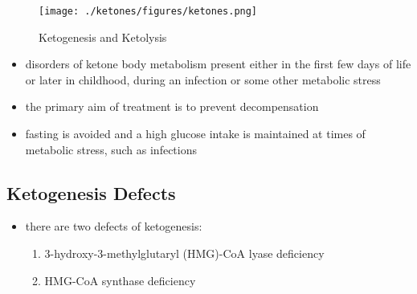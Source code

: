 \documentclass{scrartcl}
\begin{document}
\begin{figure}[htbp]
\centering
\texttt{[image: ./ketones/figures/ketones.png]}
\caption{\label{fig:orga9f7bc7}
Ketogenesis and Ketolysis}
\end{figure}

\begin{itemize}
\item disorders of ketone body metabolism present either in the first few
days of life or later in childhood, during an infection or some
other metabolic stress
\item the primary aim of treatment is to prevent decompensation
\item fasting is avoided and a high glucose intake is maintained at times
of metabolic stress, such as infections
\end{itemize}

\subsection{Ketogenesis Defects}
\label{sec:org59bce0a}
\begin{itemize}
\item there are two defects of ketogenesis:
\begin{enumerate}
\item 3-hydroxy-3-methylglutaryl (HMG)-CoA lyase deficiency
\item HMG-CoA synthase deficiency
\end{enumerate}
\end{itemize}
\end{document}

